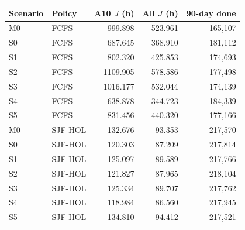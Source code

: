 \begin{tabular}{llrrr}
\toprule
Scenario & Policy & A10 $\bar J$ (h) & All $\bar J$ (h) & 90-day done\\
\midrule
M0 & FCFS & 999.898 & 523.961 & 165,107\\
S0 & FCFS & 687.645 & 368.910 & 181,112\\
S1 & FCFS & 802.320 & 425.853 & 174,693\\
S2 & FCFS & 1109.905 & 578.586 & 177,498\\
S3 & FCFS & 1016.177 & 532.044 & 174,139\\
S4 & FCFS & 638.878 & 344.723 & 184,339\\
S5 & FCFS & 831.456 & 440.320 & 177,166\\
M0 & SJF-HOL & 132.676 & 93.353 & 217,570\\
S0 & SJF-HOL & 120.303 & 87.209 & 217,814\\
S1 & SJF-HOL & 125.097 & 89.589 & 217,766\\
S2 & SJF-HOL & 121.827 & 87.965 & 218,104\\
S3 & SJF-HOL & 125.334 & 89.707 & 217,762\\
S4 & SJF-HOL & 118.984 & 86.560 & 217,945\\
S5 & SJF-HOL & 134.810 & 94.412 & 217,521\\
\bottomrule
\end{tabular}
